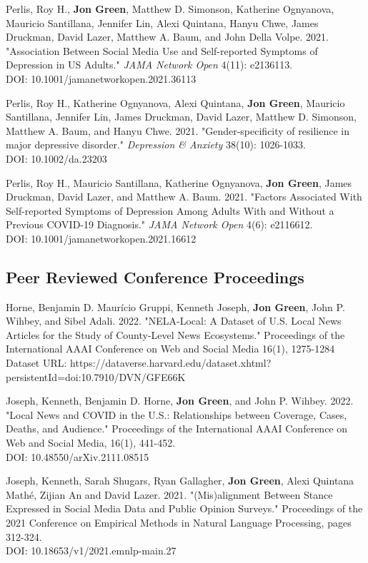 \documentclass[letterpaper]{article}
\begin{document}
\begin{etaremune}
\item  Perlis, Roy H., \textbf{Jon Green}, Matthew D. Simonson, Katherine Ognyanova, Mauricio Santillana, Jennifer Lin, Alexi Quintana, Hanyu Chwe, James Druckman, David Lazer, Matthew A. Baum, and John Della Volpe. 2021. "Association Between Social Media Use and Self-reported Symptoms of Depression in US Adults." \textit{JAMA Network Open} 4(11): e2136113. \\
DOI: 10.1001/jamanetworkopen.2021.36113

\item  Perlis, Roy H., Katherine Ognyanova, Alexi Quintana, \textbf{Jon Green}, Mauricio Santillana, Jennifer Lin, James Druckman, David Lazer, Matthew D. Simonson, Matthew A. Baum, and Hanyu Chwe. 2021. "Gender-specificity of resilience in major depressive disorder." \textit{Depression \& Anxiety} 38(10): 1026-1033. \\
DOI: 10.1002/da.23203

\item  Perlis, Roy H., Mauricio Santillana, Katherine Ognyanova, \textbf{Jon Green}, James Druckman, David Lazer, and Matthew A. Baum. 2021. "Factors Associated With Self-reported Symptoms of Depression Among Adults With and Without a Previous COVID-19 Diagnosis." \textit{JAMA Network Open} 4(6): e2116612. \\
DOI: 10.1001/jamanetworkopen.2021.16612
\end{etaremune}

\subsection*{Peer Reviewed Conference Proceedings}

\begin{etaremune}
\item Horne, Benjamin D. Maur\'{i}cio Gruppi, Kenneth Joseph, \textbf{Jon Green}, John P. Wihbey, and Sibel Adali. 2022. "NELA-Local: A Dataset of U.S. Local News Articles for the Study of County-Level News Ecosystems." Proceedings of the International AAAI Conference on Web and Social Media 16(1), 1275-1284\\
Dataset URL: https://dataverse.harvard.edu/dataset.xhtml?persistentId=doi:10.7910/DVN/GFE66K

\item Joseph, Kenneth, Benjamin D. Horne, \textbf{Jon Green}, and John P. Wihbey. 2022. "Local News and COVID in the U.S.: Relationships between Coverage, Cases, Deaths, and Audience." Proceedings of the International AAAI Conference on Web and Social Media, 16(1), 441-452.\\
DOI: 10.48550/arXiv.2111.08515

\item Joseph, Kenneth, Sarah Shugars, Ryan Gallagher, \textbf{Jon Green}, Alexi Quintana Mathé, Zijian An and David Lazer. 2021. "(Mis)alignment Between Stance Expressed in Social Media Data and Public Opinion Surveys." Proceedings of the 2021 Conference on Empirical Methods in Natural Language Processing, pages 312-324. \\
DOI: 10.18653/v1/2021.emnlp-main.27
\end{etaremune}
\end{document}
